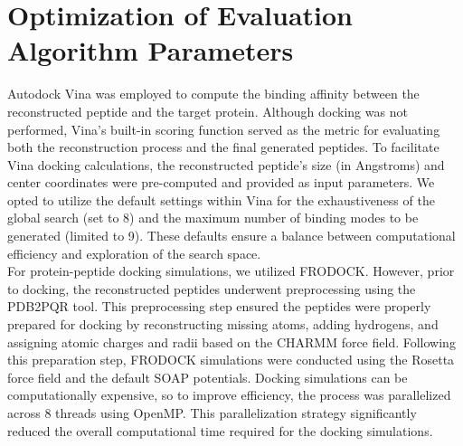 \section{Optimization of Evaluation Algorithm Parameters}
Autodock Vina was employed to compute the binding affinity between the reconstructed peptide and the target protein. Although docking was not performed, Vina's built-in scoring function served as the metric for evaluating both the reconstruction process and the final generated peptides. To facilitate Vina docking calculations, the reconstructed peptide's size (in Angstroms) and center coordinates were pre-computed and provided as input parameters. We opted to utilize the default settings within Vina for the exhaustiveness of the global search (set to 8) and the maximum number of binding modes to be generated (limited to 9). These defaults ensure a balance between computational efficiency and exploration of the search space. \\

For protein-peptide docking simulations, we utilized FRODOCK. However, prior to docking, the reconstructed peptides underwent preprocessing using the PDB2PQR tool. This preprocessing step ensured the peptides were properly prepared for docking by reconstructing missing atoms, adding hydrogens, and assigning atomic charges and radii based on the CHARMM force field. Following this preparation step, FRODOCK simulations were conducted using the Rosetta force field and the default SOAP potentials. Docking simulations can be computationally expensive, so to improve efficiency, the process was parallelized across 8 threads using OpenMP. This parallelization strategy significantly reduced the overall computational time required for the docking simulations.

